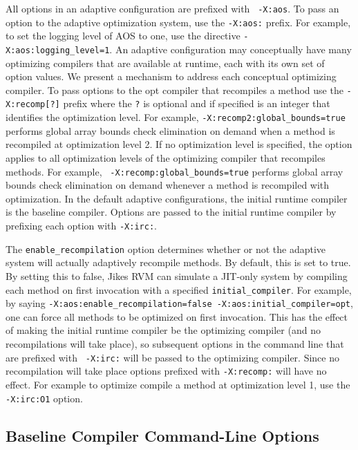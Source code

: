 All options in an adaptive configuration are prefixed with {\tt
-X:aos}.  To pass an option to the adaptive optimization system, use
the {\tt -X:aos:} prefix.  For example, to set the logging level of
AOS to one, use the directive {\tt -X:aos:logging\_level=1}. An
adaptive configuration may conceptually have many optimizing compilers
that are available at runtime, each with its own set of option values.
We present a mechanism to address each conceptual optimizing compiler.
To pass options to the opt compiler that recompiles a method use the
{\tt -X:recomp[?]} prefix where the {\tt ?} is optional and if
specified is an integer that identifies the optimization level.  For
example, {\tt -X:recomp2:global\_bounds=true} performs global array
bounds check elimination on demand when a method is recompiled at
optimization level 2.  If no optimization level is specified, the
option applies to all optimization levels of the optimizing compiler
that recompiles methods.  For example, {\tt
-X:recomp:global\_bounds=true} performs global array bounds check
elimination on demand whenever a method is recompiled with
optimization.  In the default adaptive configurations, the initial
runtime compiler is the baseline compiler.  Options are passed to the
initial runtime compiler by prefixing each option with {\tt -X:irc:}.  

The {\tt enable\_recompilation} option determines whether or not the
adaptive system will actually adaptively recompile methods.  By
default, this is set to true. By setting this to false, Jikes RVM can
simulate a JIT-only system by compiling each method on first
invocation with a specified {\tt initial\_compiler}. For example, 
by saying {\tt -X:aos:enable\_recompilation=false
-X:aos:initial\_compiler=opt}, one can force all methods to be
optimized on first invocation. 
This has the effect of making the initial runtime compiler
be the optimizing compiler (and no recompilations will take place), so
subsequent options in the command line that are prefixed with {\tt
-X:irc:} will be passed to the optimizing compiler. Since no
recompilation will take place options prefixed with {\tt -X:recomp:}
will have no effect.  For example to optimize compile a method at
optimization level 1, use the {\tt -X:irc:O1} option. 

%
\subsection{Baseline Compiler Command-Line Options}
\label{section:nonadaptive:baseline:options}

